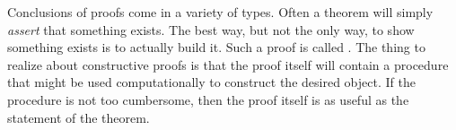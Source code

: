 Conclusions of proofs come in a variety of types.  Often a theorem will simply {\em assert} that something exists.  The best way, but not the only way, to show something exists is to actually build it.  Such a proof is called .  The thing to realize about constructive proofs is that the proof itself will contain a procedure that might be used computationally to construct the desired object.  If the procedure is not too cumbersome, then  the proof itself is as useful as the statement of the theorem.
